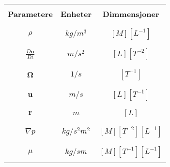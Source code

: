 \documentclass[12p,a4paper]{article}
\renewcommand{\b}{\boldsymbol}
\begin{document}
\begin{table}[H]
    \centering
    \begin{tabular}{|c|c|c|}
        \hline
        &&\\
        \bf Parametere          & \bf Enheter     & \bf Dimmensjoner \\
        &&\\
        \hline
        &&\\
        $\rho$  &  $kg/m^3$  &  $[M][L^{-1}]$ \\
        &&\\
        \hline
        &&\\
        $\frac{D\b u}{D t}$  &  $m/s^2$  &  $[L][T^{-2}]$ \\
        &&\\
        \hline
        &&\\
        $\b \Omega$  &  $1/s$  &  $[T^{-1}]$ \\
        &&\\
        \hline
        &&\\
        $\b u$  &  $m/s$  &  $[L][T^{-1}]$ \\
        &&\\
        \hline
        &&\\
        $\b r$  &  $m$  &  $[L]$ \\
        &&\\
        \hline
        &&\\
        $\nabla p$  &  $kg/s^2m^2$  &  $[M][T^{-2}][L^{-1}]$ \\
        &&\\
        \hline
        &&\\
        $\mu$  &  $kg/sm$  &  $[M][T^{-1}][L^{-1}]$ \\
        &&\\
        \hline
    \end{tabular}
\end{table}
\end{document}
